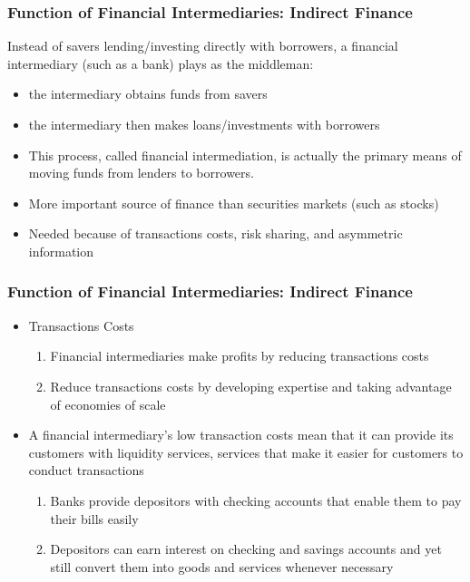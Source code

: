 \documentclass{beamer}
\begin{document}
\begin{frame}
\frametitle{Function of Financial Intermediaries: Indirect Finance }
Instead of savers lending/investing directly with borrowers, a financial intermediary (such as a bank) plays as the middleman:
\begin{itemize}
\item the intermediary obtains funds from savers
\item the intermediary then makes loans/investments with borrowers
\item This process, called financial intermediation, is actually the primary means of moving funds from lenders to borrowers.
\item More important source of finance than securities markets (such as stocks)
\item Needed because of transactions costs, risk sharing, and asymmetric information
\end{itemize}
\end{frame}



\begin{frame}
\frametitle{Function of Financial Intermediaries: Indirect Finance }
\begin{itemize}
\item Transactions Costs

\begin{enumerate}
\item Financial intermediaries make profits by reducing transactions costs
\item Reduce transactions costs by developing expertise and taking advantage of economies of scale
\end{enumerate}
\vspace{\baselineskip}

\item A financial intermediary's low transaction costs mean that it can provide its customers with liquidity services, services that make it easier for customers to conduct transactions
\begin{enumerate}
\item Banks provide depositors with checking accounts that enable them to pay their bills easily
\item Depositors can earn interest on checking and savings accounts and yet still convert them into goods and services whenever necessary
\end{enumerate}


\end{itemize}
\end{frame}
\end{document}
